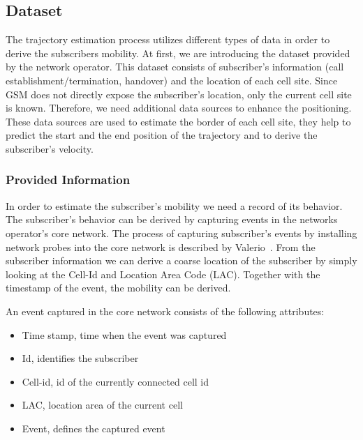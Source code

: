 \documentclass[twocolumn]{bmcart}%
\begin{document}
\subsection*{Dataset}
The trajectory estimation process utilizes different types of data in order to derive the subscribers mobility. At first, we are introducing the dataset provided by the network operator. This dataset consists of subscriber's information (call establishment/termination, handover) and the location of each cell site. Since GSM does not directly expose the subscriber's location, only the current cell site is known. Therefore, we need additional data sources to enhance the positioning. These data sources are used to estimate the border of each cell site, they help to predict the start and the end position of the trajectory and to derive the subscriber's velocity.
\subsubsection*{Provided Information}
In order to estimate the subscriber's mobility we need a record of its behavior. The subscriber's behavior can be derived by capturing events in the networks operator's core network. The process of capturing subscriber's events by installing network probes into the core network is described by Valerio~\cite{RoadCell2009}. From the subscriber information we can derive a coarse location of the subscriber by simply looking at the Cell-Id and Location Area Code (LAC). Together with the timestamp of the event, the mobility can be derived.

An event captured in the core network consists of the following attributes:
\begin{itemize}
	\item Time stamp, time when the event was captured
	\item Id, identifies the subscriber
	\item Cell-id, id of the currently connected cell id
	\item LAC, location area of the current cell
	\item Event, defines the captured event
\end{itemize}
\end{document}
